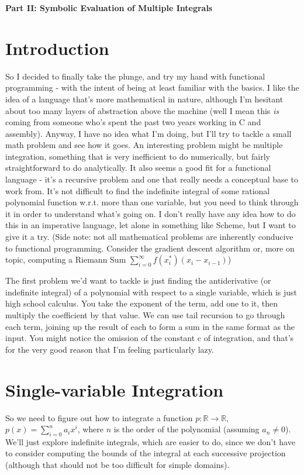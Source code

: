 \documentclass{article}
\begin{document}
\date{}

{\Large
\textbf{Part II: Symbolic Evaluation of Multiple Integrals}
}

\section{Introduction}
\par
So I decided to finally take the plunge, and try my hand with functional programming - with the intent of being at least familiar with the basics. I like the idea of a language that's more mathematical in nature, although I'm hesitant about too many layers of abstraction above the machine (well I mean this \textit{is} coming from someone who's spent the past two years working in C and assembly). Anyway, I have no idea what I'm doing, but I'll try to tackle a small math problem and see how it goes. An interesting problem might be multiple integration, something that is very inefficient to do numerically, but fairly straightforward to do analytically. It also seems a good fit for a functional language - it's a recursive problem and one that really needs a conceptual base to work from. It's not difficult to find the indefinite integral of some rational polynomial function w.r.t. more than one variable, but you need to think through it in order to understand what's going on. I don't really have any idea how to do this in an imperative language, let alone in something like Scheme, but I want to give it a try. (Side note: not all mathematical problems are inherently conducive to functional programming. Consider the gradient descent algorithm or, more on topic, computing a Riemann Sum \( \sum_{i = 0}^{\infty} f(x_{i}^{*}) (x_{i} - x_{i-1}) \))

\par
The first problem we'd want to tackle is just finding the antiderivative (or indefinite integral) of a polynomial with respect to a single variable, which is just high school calculus. You take the exponent of the term, add one to it, then multiply the coefficient by that value. We can use tail recursion to go through each term, joining up the result of each to form a sum in the same format as the input. You might notice the omission of the constant c of integration, and that's for the very good reason that I'm feeling particularly lazy.

\section{Single-variable Integration}
So we need to figure out how to integrate a function \( p : \mathbb{R} \rightarrow \mathbb{R} \), \( p(x) = \sum_{i = 0}^{n} a_{i}x^{i} \), where \(n\) is the order of the polynomial (assuming \(a_{n} \neq 0 \)). We'll just explore indefinite integrals, which are easier to do, since we don't have to consider computing the bounds of the integral at each successive projection (although that should not be too difficult for simple domains).
\end{document}
